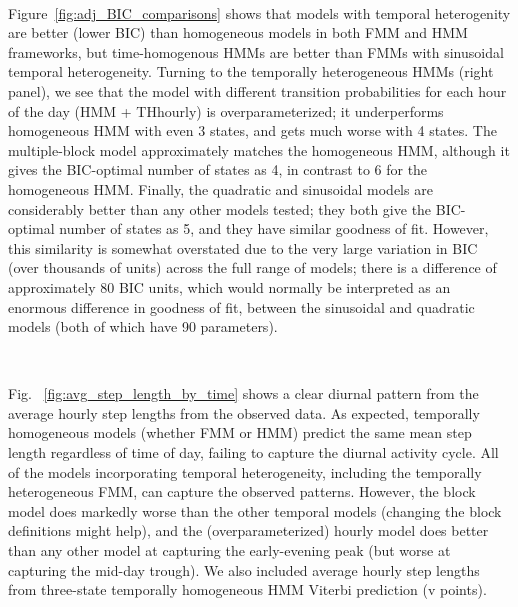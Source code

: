 \documentclass{bmcart}
\begin{document}
\

Figure~\ref{fig:adj_BIC_comparisons} shows that models with temporal heterogenity are better (lower BIC) than homogeneous models in both FMM and HMM frameworks, but time-homogenous HMMs are better than FMMs with sinusoidal temporal heterogeneity. Turning to the temporally heterogeneous HMMs (right panel), we see that the model with different transition probabilities for each hour of the day (HMM + THhourly) is overparameterized; it underperforms homogeneous HMM with even 3 states, and gets much worse with 4 states. The multiple-block model approximately matches the homogeneous HMM, although it gives the BIC-optimal number of states as 4, in contrast to 6 for the homogeneous HMM.  Finally, the quadratic and sinusoidal models are considerably better than any other models tested; they both give the BIC-optimal number of states as 5, and they have similar goodness of fit.
However, this similarity is somewhat overstated due to the very large variation in BIC (over thousands of units) across the full range of models; there is a difference of approximately 80 BIC units, which would
normally be interpreted as an enormous difference in goodness of fit,
between the sinusoidal and quadratic models (both of which have 90 
parameters).

\

Fig. ~\ref{fig:avg_step_length_by_time} shows a clear diurnal pattern from the average hourly step lengths from the observed data. As expected, temporally homogeneous models (whether FMM or HMM) predict the same mean step length regardless of time of day, failing to capture the diurnal activity cycle. All of the models incorporating temporal heterogeneity, including the temporally heterogeneous FMM, can capture the observed patterns. However, the block model does markedly worse than the other temporal models (changing the block definitions might help), and the (overparameterized) hourly model does better than any other model at capturing the early-evening peak (but worse at capturing the mid-day trough). We also included average hourly step lengths from three-state temporally homogeneous HMM Viterbi prediction (v points).

\
\end{document}
